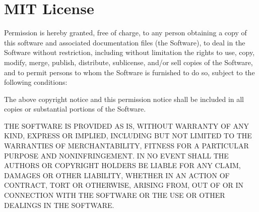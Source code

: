 \chapter{MIT License }
\hypertarget{md_frontend_2node__modules_2ts-api-utils_2_l_i_c_e_n_s_e}{}\label{md_frontend_2node__modules_2ts-api-utils_2_l_i_c_e_n_s_e}
\label{md_frontend_2node__modules_2ts-api-utils_2_l_i_c_e_n_s_e_autotoc_md7337}%
%


Permission is hereby granted, free of charge, to any person obtaining a copy of this software and associated documentation files (the \textquotesingle{}Software\textquotesingle{}), to deal in the Software without restriction, including without limitation the rights to use, copy, modify, merge, publish, distribute, sublicense, and/or sell copies of the Software, and to permit persons to whom the Software is furnished to do so, subject to the following conditions\+:

The above copyright notice and this permission notice shall be included in all copies or substantial portions of the Software.

THE SOFTWARE IS PROVIDED \textquotesingle{}AS IS\textquotesingle{}, WITHOUT WARRANTY OF ANY KIND, EXPRESS OR IMPLIED, INCLUDING BUT NOT LIMITED TO THE WARRANTIES OF MERCHANTABILITY, FITNESS FOR A PARTICULAR PURPOSE AND NONINFRINGEMENT. IN NO EVENT SHALL THE AUTHORS OR COPYRIGHT HOLDERS BE LIABLE FOR ANY CLAIM, DAMAGES OR OTHER LIABILITY, WHETHER IN AN ACTION OF CONTRACT, TORT OR OTHERWISE, ARISING FROM, OUT OF OR IN CONNECTION WITH THE SOFTWARE OR THE USE OR OTHER DEALINGS IN THE SOFTWARE. 